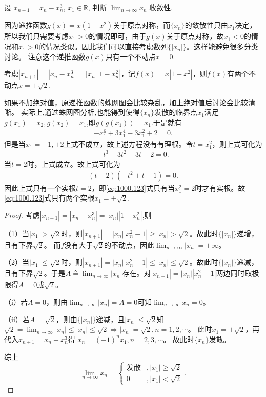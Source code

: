 \documentclass[../../main.tex]{subfiles}%
\begin{document}
\begin{example}
设 $x_{n+1} = x_n - x_n^3$, $x_1 \in \mathbb{R}$, 判断 $\lim_{n \to \infty} x_n$ 收敛性.
\end{example}
\begin{note}
因为递推函数$g(x) = x(1 - x^2)$关于原点对称，而$\{ x_n \}$的敛散性只由$x_1$决定，所以我们只需要考虑$x_1 > 0$的情况即可，由于$g(x)$关于原点对称，故$x_1 < 0$的情况和$x_1 > 0$的情况类似。因此我们可以直接考虑数列$\{ |x_n| \}$。这样能避免很多分类讨论。
注意这个递推函数$g(x)$只有一个不动点$x=0$.

考虑$|x_{n+1}| = |x_n - x_n^3| = |x_n| |1 - x_n^2|$，记$f(x) = x |1 - x^2|$，则$f(x)$有两个不动点$x=\pm \sqrt{2}.$

如果不加绝对值，原递推函数的蛛网图会比较杂乱，加上绝对值后讨论会比较清晰。
实际上,通过蛛网图分析,也能得到使得$\{x_n\}$发散的临界点$x_1$满足$g(x_1)=x_2,g(x_2)=x_1$,即$g(g(x_1))=x_1$.于是就有
\begin{align}
-x_1^6 + 3x_1^4 - 3x_1^2 + 2 = 0.\label{eq:1000.123}
\end{align}
但是当$x_1 = \pm 1, \pm 2$上式不成立，故上述方程没有有理根。令$t = x_1^2$，则上式可化为
\begin{align*}
-t^3 + 3t^2 - 3t + 2 = 0.
\end{align*}
当$t = 2$时，上式成立。故上式可化为
\begin{align*}
(t - 2)(-t^2 + t - 1) = 0.
\end{align*}
因此上式只有一个实根$t = 2$，即\eqref{eq:1000.123}式只有当$x_1^2 = 2$时才有实根。故\eqref{eq:1000.123}式只有两个实根$x_1 = \pm \sqrt{2}$.
\end{note}
\begin{proof}

考虑$|x_{n+1}| = |x_n - x_n^3| = |x_n| |1 - x_n^2|$,则

（1）当$|x_1| > \sqrt{2}$时，则$|x_{n+1}| = |x_n| |x_n^2 - 1| \geqslant |x_n| > \sqrt{2}$。故此时$\{ |x_n| \}$递增，且有下界$\sqrt{2}$。
而$f$没有大于$\sqrt{2}$的不动点，因此$\lim_{n \to \infty} |x_n| = +\infty$。

（2）当$|x_1| \leqslant \sqrt{2}$时，则$|x_{n+1}| = |x_n| |x_n^2 - 1| \leqslant |x_n| \leqslant \sqrt{2}$。故此时$\{ |x_n| \}$递减，且有下界$\sqrt{2}$。于是$A \triangleq \lim_{n \to \infty} |x_n|$存在。对$|x_{n+1}| = |x_n| |x_n^2 - 1|$两边同时取极限得$A = 0$或$\sqrt{2}$。

（i）若$A = 0$，则由$\lim_{n \to \infty} |x_n| = A = 0$可知$\lim_{n \to \infty} x_n = 0$。

（ii）若$A = \sqrt{2}$，则由$\{ |x_n| \}$递减，且$|x_n| \leqslant \sqrt{2}$知
$\sqrt{2} = \lim_{n \to \infty} |x_n| \leqslant |x_n| \leqslant \sqrt{2} \Rightarrow |x_n| = \sqrt{2}, n = 1, 2, \cdots$。
此时$x_1 = \pm \sqrt{2}$，再代入$x_{n+1} = x_n - x_n^3$得
$x_n = (-1)^n x_1, n = 2, 3, \cdots$。
故此时$\{ x_n \}$发散。

综上
$$\lim_{n \to \infty} x_n = \begin{cases} \text{发散}&, |x_1| \geqslant \sqrt{2} \\ 0&,|x_1| < \sqrt{2} \end{cases}.$$

\end{proof}
\end{document}
